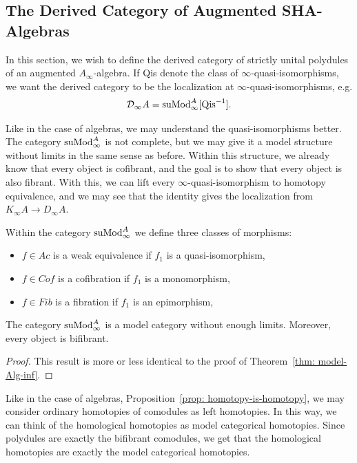 \documentclass[../thesis.tex]{subfiles}
\begin{document}
        \subsection{The Derived Category of Augmented SHA-Algebras} 

            In this section, we wish to define the derived category of strictly unital polydules of an augmented $A_\infty$-algebra. If Qis denote the class of $\infty$-quasi-isomorphisms, we want the derived category to be the localization at $\infty$-quasi-isomorphisms, e.g.
            \begin{align*}
                \mathcal{D}_\infty A = \tt{suMod}_\infty^A[\tt{Qis}^{-1}].
            \end{align*}

            Like in the case of algebras, we may understand the quasi-isomorphisms better. The category $\tt{suMod}_\infty^A$ is not complete, but we may give it a model structure without limits in the same sense as before. Within this structure, we already know that every object is cofibrant, and the goal is to show that every object is also fibrant. With this, we can lift every $\infty$-quasi-isomorphism to homotopy equivalence, and we may see that the identity gives the localization from $K_\infty A \to D_\infty A$.

            Within the category $\tt{suMod}_\infty^A$ we define three classes of morphisms:
            \begin{itemize}
                \item $f\in Ac$ is a weak equivalence if $f_1$ is a quasi-isomorphism,
                \item $f\in Cof$ is a cofibration if $f_1$ is a monomorphism,
                \item $f\in Fib$ is a fibration if $f_1$ is an epimorphism,
            \end{itemize}

            \begin{thm}
                The category $\tt{suMod}_\infty^A$ is a model category without enough limits. Moreover, every object is bifibrant.
            \end{thm}

            \begin{proof}
                This result is more or less identical to the proof of Theorem~\ref{thm: model-Alg-inf}.
            \end{proof}

            Like in the case of algebras, Proposition~\ref{prop: homotopy-is-homotopy}, we may consider ordinary homotopies of comodules as left homotopies. In this way, we can think of the homological homotopies as model categorical homotopies. Since polydules are exactly the bifibrant comodules, we get that the homological homotopies are exactly the model categorical homotopies.
\end{document}
